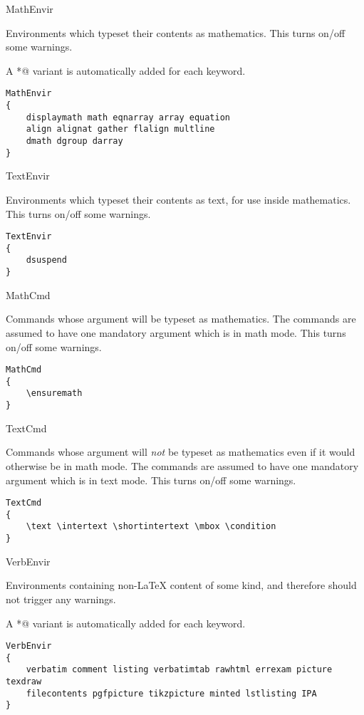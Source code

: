 \begin{chktexrclistvar}{MathEnvir}

Environments which typeset their contents as mathematics.
This turns on/off some warnings.

A \verb@*@ variant is automatically added for each keyword.

\chktexrcdefault\begin{verbatim}
MathEnvir
{
    displaymath math eqnarray array equation
    align alignat gather flalign multline
    dmath dgroup darray
}
\end{verbatim}
\end{chktexrclistvar}


\begin{chktexrclistvar}{TextEnvir}

Environments which typeset their contents as text, for use inside
mathematics.  This turns on/off some warnings.

\chktexrcdefault\begin{verbatim}
TextEnvir
{
    dsuspend
}
\end{verbatim}
\end{chktexrclistvar}


\begin{chktexrclistvar}{MathCmd}

Commands whose argument will be typeset as mathematics.
The commands are assumed to have one mandatory argument which is in
math mode.  This turns on/off some warnings.

\chktexrcdefault\begin{verbatim}
MathCmd
{
    \ensuremath
}
\end{verbatim}
\end{chktexrclistvar}


\begin{chktexrclistvar}{TextCmd}

Commands whose argument will \emph{not} be typeset as
mathematics even if it would otherwise be in math mode.
The commands are assumed to have one mandatory argument which is in
text mode.  This turns on/off some warnings.

\chktexrcdefault\begin{verbatim}
TextCmd
{
    \text \intertext \shortintertext \mbox \condition
}
\end{verbatim}
\end{chktexrclistvar}


\begin{chktexrclistvar}{VerbEnvir}

Environments containing non-\LaTeX{} content of some kind, and
therefore should not trigger any warnings.

A \verb@*@ variant is automatically added for each keyword.

\chktexrcdefault\begin{verbatim}
VerbEnvir
{
    verbatim comment listing verbatimtab rawhtml errexam picture texdraw
    filecontents pgfpicture tikzpicture minted lstlisting IPA
}
\end{verbatim}
\end{chktexrclistvar}



